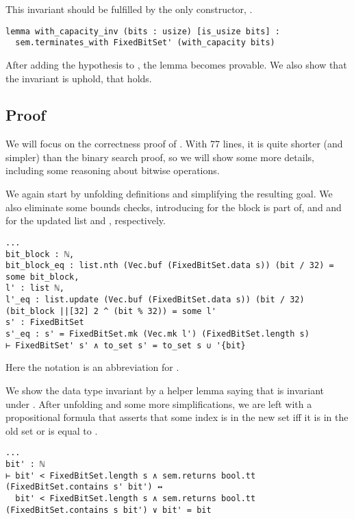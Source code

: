 This invariant should be fulfilled by the only constructor, .

\begin{verbatim}
lemma with_capacity_inv (bits : usize) [is_usize bits] :
  sem.terminates_with FixedBitSet' (with_capacity bits)
\end{verbatim}

After adding the hypothesis \lean{[FixedBitSet' s]} to , the
lemma becomes provable. We also show that the invariant is uphold, \ie that
 holds.

\subsection{Proof}

We will focus on the correctness proof of . With 77 lines, it is
quite shorter (and simpler) than the binary search proof, so we will show some
more details, including some reasoning about bitwise operations.

We again start by unfolding definitions and simplifying the resulting goal. We
also eliminate some bounds checks, introducing  for the  block
 is part of, and  and  for the updated list and
, respectively.

\begin{verbatim}
...
bit_block : ℕ,
bit_block_eq : list.nth (Vec.buf (FixedBitSet.data s)) (bit / 32) = some bit_block,
l' : list ℕ,
l'_eq : list.update (Vec.buf (FixedBitSet.data s)) (bit / 32) (bit_block ||[32] 2 ^ (bit % 32)) = some l'
s' : FixedBitSet
s'_eq : s' = FixedBitSet.mk (Vec.mk l') (FixedBitSet.length s)
⊢ FixedBitSet' s' ∧ to_set s' = to_set s ∪ '{bit}
\end{verbatim}

Here the notation \lean{||[32]} is an abbreviation for .

We show the data type invariant by a helper lemma saying that
 is invariant under . After unfolding
 and some more simplifications, we are left with a propositional
formula that asserts that some index  is in the new set iff it is in
the old set or is equal to .

\begin{verbatim}
...
bit' : ℕ
⊢ bit' < FixedBitSet.length s ∧ sem.returns bool.tt (FixedBitSet.contains s' bit') ↔
  bit' < FixedBitSet.length s ∧ sem.returns bool.tt (FixedBitSet.contains s bit') ∨ bit' = bit
\end{verbatim}

